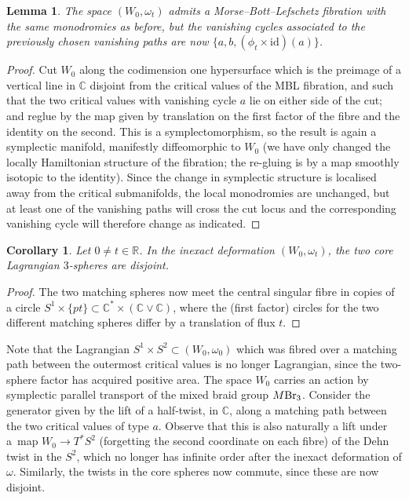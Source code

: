 \documentclass[10pt,a4paper]{amsart}
\def\bC{\mathbb{C}}
\def\bR{\mathbb{R}}
\newcommand{\id}{\mathrm{id}}
\newtheorem{lem}[thm]{Lemma}
\newtheorem{cor}[thm]{Corollary}
\theoremstyle{definition}
\numberwithin{equation}{section}
\begin{document}
\begin{lem}
The space $(W_0,\omega_t)$ admits a Morse--Bott--Lefschetz fibration with the same monodromies as before, but the vanishing cycles associated to the previously chosen vanishing paths are now $\{a,b,(\phi_t\times \id)(a)\}$.
\end{lem}

\begin{proof}
 Cut $W_0$ along the codimension one hypersurface which is the preimage of a vertical line in $\bC$ disjoint from the critical values of the MBL fibration, and such that the two critical values with vanishing cycle $a$ lie on either side of the cut; and reglue by the map given by translation on the first factor of the fibre and the identity on the second. This is a symplectomorphism, so the result is again a symplectic manifold, manifestly diffeomorphic to $W_0$ (we have only changed the locally Hamiltonian structure of the fibration; the re-gluing is by a map smoothly isotopic to the identity). Since the change in symplectic structure is localised away from the critical submanifolds, the local monodromies are unchanged, but at least one of the vanishing paths will cross the cut locus and the corresponding vanishing cycle will therefore change as indicated.
\end{proof}

\begin{cor}\label{cor:disjoinable}
 Let $0 \neq t \in \bR$. In the inexact deformation $(W_0,\omega_t)$, the two core Lagrangian $3$-spheres are disjoint.
\end{cor}

\begin{proof}
 The two matching spheres now meet the central singular fibre in copies of a circle $S^1 \times \{pt\} \subset \bC^*\times (\bC\vee\bC)$, where the (first factor) circles for the two different matching spheres differ by a translation of flux $t$.
\end{proof}

Note that the Lagrangian $S^1 \times S^2 \subset (W_0,\omega_0)$ which was fibred over a matching path between the outermost critical values is no longer Lagrangian, since the two-sphere factor has acquired positive area. The space $W_0$ carries an action by symplectic parallel transport of the mixed braid group $M{\rm Br}_3$. Consider the generator given by the lift of a half-twist, in $\bC$, along a matching path between the two critical values of type $a$. Observe that this is also naturally a lift under a~map $W_0 \to T^*S^2$ (forgetting the second coordinate on each fibre) of the Dehn twist in the $S^2$, which no longer has infinite order after the inexact deformation of $\omega$. Similarly, the twists in the core spheres now commute, since these are now disjoint.
\end{document}
